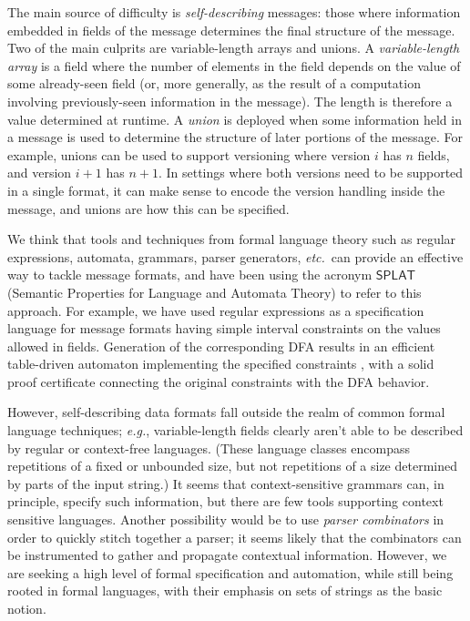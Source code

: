 \documentclass[svgnames]{llncs}
\newcommand{\eg}{\textit{e.g.}}
\newcommand{\etc}{\textit{etc.}}
\newcommand{\konst}[1]{\ensuremath{\mathsf{#1}}}
\begin{document}
The main source of difficulty is \emph{self-describing} messages:
those where information embedded in fields of the message determines
the final structure of the message. Two of the main culprits are
variable-length arrays and unions. A \emph{variable-length array} is a
field where the number of elements in the field depends on the value
of some already-seen field (or, more generally, as the result of a
computation involving previously-seen information in the message).
The length is therefore a value determined at runtime. A \emph{union}
is deployed when some information held in a message is used to
determine the structure of later portions of the message. For example,
unions can be used to support versioning where version $i$ has $n$
fields, and version $i+1$ has $n+1$. In settings where both versions
need to be supported in a single format, it can make sense to encode
the version handling inside the message, and unions are how this can
be specified.

We think that tools and techniques from formal language theory such as
regular expressions, automata, grammars, parser generators, \etc\, can
provide an effective way to tackle message formats, and have been
using the acronym \konst{SPLAT} (Semantic Properties for Language and
Automata Theory) to refer to this approach. For example, we have used
regular expressions as a specification language for message formats
having simple interval constraints on the values allowed in
fields. Generation of the corresponding DFA results in an efficient
table-driven automaton implementing the specified constraints \cite{},
with a solid proof certificate connecting the original constraints
with the DFA behavior.

However, self-describing data formats fall outside the realm of common
formal language techniques; \eg, variable-length fields clearly aren't
able to be described by regular or context-free languages. (These
language classes encompass repetitions of a fixed or unbounded size,
but not repetitions of a size determined by parts of the input
string.) It seems that context-sensitive grammars can, in principle,
specify such information, but there are few tools supporting context
sensitive languages. Another possibility would be to use \emph{parser
  combinators} in order to quickly stitch together a parser; it seems
likely that the combinators can be instrumented to gather and
propagate contextual information. However, we are seeking a high level
of formal specification and automation, while still being rooted in
formal languages, with their emphasis on sets of strings as the basic
notion.
\end{document}
